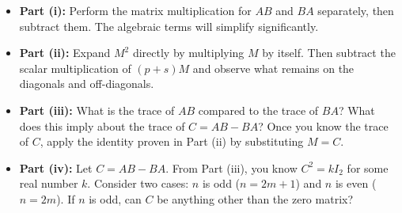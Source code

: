 \begin{hint}
\begin{itemize}
    \item \textbf{Part (i):} Perform the matrix multiplication for $AB$ and $BA$ separately, then subtract them. The algebraic terms will simplify significantly.
    \item \textbf{Part (ii):} Expand $M^2$ directly by multiplying $M$ by itself. Then subtract the scalar multiplication of $(p+s)M$ and observe what remains on the diagonals and off-diagonals.
    \item \textbf{Part (iii):} What is the trace of $AB$ compared to the trace of $BA$? What does this imply about the trace of $C = AB - BA$? Once you know the trace of $C$, apply the identity proven in Part (ii) by substituting $M = C$.
    \item \textbf{Part (iv):} Let $C = AB - BA$. From Part (iii), you know $C^2 = kI_2$ for some real number $k$. Consider two cases: $n$ is odd ($n = 2m+1$) and $n$ is even ($n = 2m$). If $n$ is odd, can $C$ be anything other than the zero matrix?
\end{itemize}
\end{hint}

